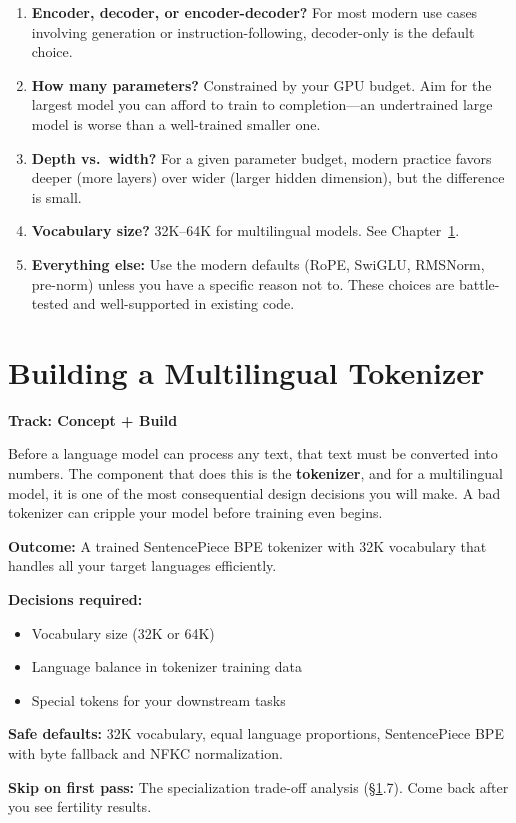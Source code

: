 \documentclass[11pt,a4paper]{article}
\begin{document}
\begin{enumerate}
    \item \textbf{Encoder, decoder, or encoder-decoder?} For most modern use cases involving generation or instruction-following, decoder-only is the default choice.
    \item \textbf{How many parameters?} Constrained by your GPU budget. Aim for the largest model you can afford to train to completion---an undertrained large model is worse than a well-trained smaller one.
    \item \textbf{Depth vs.\ width?} For a given parameter budget, modern practice favors deeper (more layers) over wider (larger hidden dimension), but the difference is small.
    \item \textbf{Vocabulary size?} 32K--64K for multilingual models. See Chapter~\ref{ch:tokenizer}.
    \item \textbf{Everything else:} Use the modern defaults (RoPE, SwiGLU, RMSNorm, pre-norm) unless you have a specific reason not to. These choices are battle-tested and well-supported in existing code.
\end{enumerate}


\section{Building a Multilingual Tokenizer}
\label{ch:tokenizer}

\begin{center}
\colorbox{lightaccent}{\textbf{Track: Concept + Build}}
\end{center}

Before a language model can process any text, that text must be converted into numbers. The component that does this is the \textbf{tokenizer}, and for a multilingual model, it is one of the most consequential design decisions you will make. A bad tokenizer can cripple your model before training even begins.

\begin{buildnow}
\textbf{Outcome:} A trained SentencePiece BPE tokenizer with 32K vocabulary that handles all your target languages efficiently.

\textbf{Decisions required:}
\begin{itemize}[nosep]
  \item Vocabulary size (32K or 64K)
  \item Language balance in tokenizer training data
  \item Special tokens for your downstream tasks
\end{itemize}

\textbf{Safe defaults:} 32K vocabulary, equal language proportions, SentencePiece BPE with byte fallback and NFKC normalization.

\textbf{Skip on first pass:} The specialization trade-off analysis (\S\ref{ch:tokenizer}.7). Come back after you see fertility results.
\end{buildnow}
\end{document}
